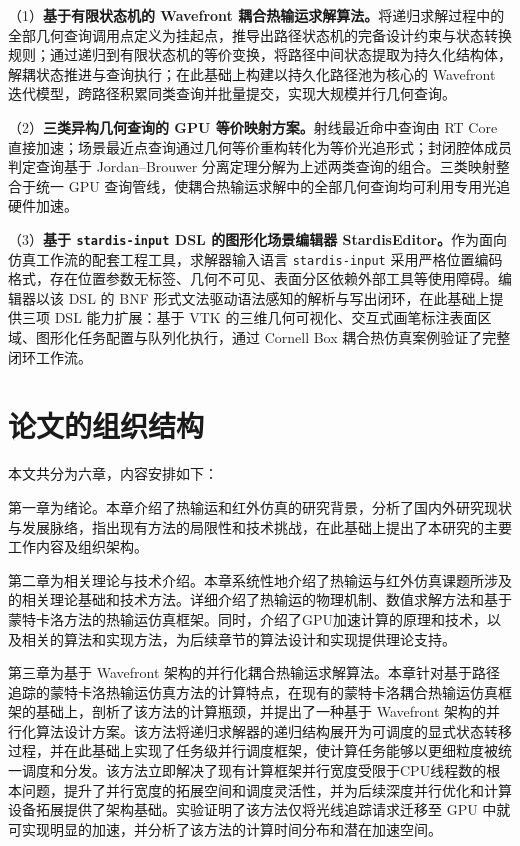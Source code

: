 （1）\textbf{基于有限状态机的 Wavefront 耦合热输运求解算法。}将递归求解过程中的全部几何查询调用点定义为挂起点，推导出路径状态机的完备设计约束与状态转换规则；通过递归到有限状态机的等价变换，将路径中间状态提取为持久化结构体，解耦状态推进与查询执行；在此基础上构建以持久化路径池为核心的 Wavefront 迭代模型，跨路径积累同类查询并批量提交，实现大规模并行几何查询。

（2）\textbf{三类异构几何查询的 GPU 等价映射方案。}射线最近命中查询由 RT Core 直接加速；场景最近点查询通过几何等价重构转化为等价光追形式；封闭腔体成员判定查询基于 Jordan--Brouwer 分离定理分解为上述两类查询的组合。三类映射整合于统一 GPU 查询管线，使耦合热输运求解中的全部几何查询均可利用专用光追硬件加速。

（3）\textbf{基于 \texttt{stardis-input} DSL 的图形化场景编辑器 StardisEditor。}作为面向仿真工作流的配套工程工具，求解器输入语言 \texttt{stardis-input} 采用严格位置编码格式，存在位置参数无标签、几何不可见、表面分区依赖外部工具等使用障碍。编辑器以该 DSL 的 BNF 形式文法驱动语法感知的解析与写出闭环，在此基础上提供三项 DSL 能力扩展：基于 VTK 的三维几何可视化、交互式画笔标注表面区域、图形化任务配置与队列化执行，通过 Cornell Box 耦合热仿真案例验证了完整闭环工作流。


\section{论文的组织结构}
本文共分为六章，内容安排如下：

第一章为绪论。本章介绍了热输运和红外仿真的研究背景，分析了国内外研究现状与发展脉络，指出现有方法的局限性和技术挑战，在此基础上提出了本研究的主要工作内容及组织架构。

第二章为相关理论与技术介绍。本章系统性地介绍了热输运与红外仿真课题所涉及的相关理论基础和技术方法。详细介绍了热输运的物理机制、数值求解方法和基于蒙特卡洛方法的热输运仿真框架。同时，介绍了GPU加速计算的原理和技术，以及相关的算法和实现方法，为后续章节的算法设计和实现提供理论支持。

第三章为基于 Wavefront 架构的并行化耦合热输运求解算法。本章针对基于路径追踪的蒙特卡洛热输运仿真方法的计算特点，在现有的蒙特卡洛耦合热输运仿真框架的基础上，剖析了该方法的计算瓶颈，并提出了一种基于 Wavefront 架构的并行化算法设计方案。该方法将递归求解器的递归结构展开为可调度的显式状态转移过程，并在此基础上实现了任务级并行调度框架，使计算任务能够以更细粒度被统一调度和分发。该方法立即解决了现有计算框架并行宽度受限于CPU线程数的根本问题，提升了并行宽度的拓展空间和调度灵活性，并为后续深度并行优化和计算设备拓展提供了架构基础。实验证明了该方法仅将光线追踪请求迁移至 GPU 中就可实现明显的加速，并分析了该方法的计算时间分布和潜在加速空间。

